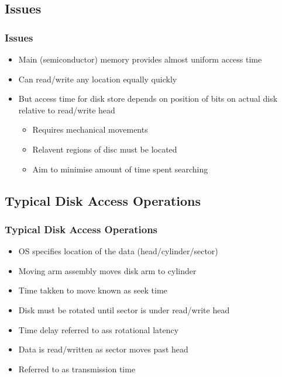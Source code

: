 \documentclass{beamer}
\begin{document}
\subsection{Issues}
\begin{frame}
\frametitle{Issues}
\begin{itemize}
\item Main (semiconductor) memory provides almost uniform access time
\item Can read/write any location equally quickly
\item But access time for disk store depends on position of bits on actual disk relative to read/write head
\begin{itemize}
\item Requires mechanical movements
\item Relavent regions of disc must be located
\item Aim to minimise amount of time spent searching
\end{itemize}
\end{itemize}
\end{frame}
\subsection{Typical Disk Access Operations}
\begin{frame}
\frametitle{Typical Disk Access Operations}
\begin{itemize}
\item OS specifies location of the data (head/cylinder/sector)
\item Moving arm assembly moves disk arm to cylinder
\item Time takken to move known as seek time
\item Disk must be rotated until sector is under read/write head
\item Time delay referred to ass rotational latency
\item Data is read/written as sector moves past head
\item Referred to as transmission time
\end{itemize}
\end{frame}
\end{document}
